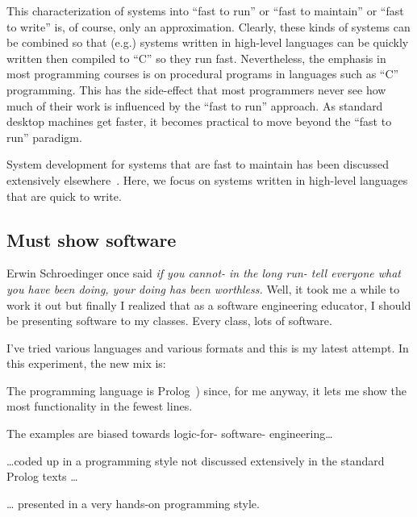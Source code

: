 This characterization of systems into ``fast to run'' or ``fast to
maintain'' or ``fast to write'' is, of course, only an
approximation. Clearly, these kinds of systems can be combined so
that (e.g.) systems written in high-level languages can be quickly
written then compiled to ``C'' so they run fast. Nevertheless, the
emphasis in most programming courses is on procedural programs in
languages such as ``C'' programming. This has the side-effect that
most programmers never see how much of their work is influenced by
the ``fast to run'' approach. As standard desktop machines get
faster, it becomes practical to move beyond the ``fast to run''
paradigm.

System development for systems that are fast to maintain has been
discussed extensively elsewhere~\cite{date95}. Here, we focus on
systems written in high-level languages that are quick to write.


\subsection{Must show software}

Erwin Schroedinger once said {\em if you cannot- in the long run-
tell everyone what you have been doing, your doing has been
worthless.} Well, it took me a while to work it out but finally I
realized that as a software engineering educator, I should be
presenting software to my classes. Every class, lots of software.

I've tried various languages and various formats and this is my latest attempt. In
this experiment, the new  mix is:



 \bi \item

The programming language is
Prolog~\cite{der96,me89zb,bratko01,ok90,sterling94}) since, for me
anyway,  it lets me show the most functionality in the fewest lines.

\item

The examples are biased towards logic-for- software-
engineering\ldots

\item

\dots coded up in a programming style not discussed extensively in
the standard Prolog texts {\ldots}

\item {\ldots} presented in a very hands-on programming style. \ei

